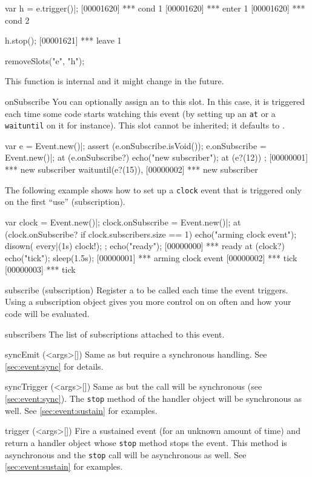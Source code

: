 \begin{urbiscriptapi}
\begin{urbiscript}
var h = e.trigger()|;
[00001620] *** cond 1
[00001620] *** enter 1
[00001620] *** cond 2

h.stop();
[00001621] *** leave 1
\end{urbiscript}
\begin{urbicomment}
removeSlots("e", "h");
\end{urbicomment}
This function is internal and it might change in the future.


\item[onSubscribe]%
  You can optionally assign an  to this slot.  In this
  case, it is triggered each time some code starts watching this event (by
  setting up an \lstinline|at| or a \lstinline|waituntil| on it for
  instance).  This slot cannot be inherited; it defaults to
  .

\begin{urbiscript}
var e = Event.new()|;
assert (e.onSubscribe.isVoid());
e.onSubscribe = Event.new()|;
at (e.onSubscribe?)
  echo("new subscriber");
at (e?(12)) {};
[00000001] *** new subscriber
waituntil(e?(15)),
[00000002] *** new subscriber
\end{urbiscript}

  The following example shows how to set up a \lstinline|clock| event that
  is triggered only on the first ``use'' (subscription).
\begin{urbiscript}
var clock = Event.new()|;
clock.onSubscribe = Event.new()|;
at (clock.onSubscribe? if clock.subscribers.size == 1)
{
  echo("arming clock event");
  disown({ every|(1s) clock!});
};
echo("ready");
[00000000] *** ready
at (clock?)
  echo("tick");
sleep(1.5s);
[00000001] *** arming clock event
[00000002] *** tick
[00000003] *** tick
\end{urbiscript}


\item[subscribe](subscription)%
  Register a  to be called each time the event triggers.
  Using a subscription object gives you more control on on often and how
  your code will be evaluated.


\item[subscribers]
  The list of subscriptions attached to this event.


\item[syncEmit](<args>[])%
  Same as  but require a synchronous handling.  See
  \autoref{sec:event:sync} for details.


\item[syncTrigger](<args>[])%
  Same as  but the call will be synchronous (see
  \autoref{sec:event:sync}). The \lstinline|stop| method of the handler
  object will be synchronous as well.  See \autoref{sec:event:sustain} for
  examples.


\item[trigger](<args>[])%
  Fire a sustained event (for an unknown amount of time) and return a
  handler object whose \lstinline|stop| method stops the event. This method
  is asynchronous and the \lstinline|stop| call will be asynchronous as
  well.  See \autoref{sec:event:sustain} for examples.
\end{urbiscriptapi}

